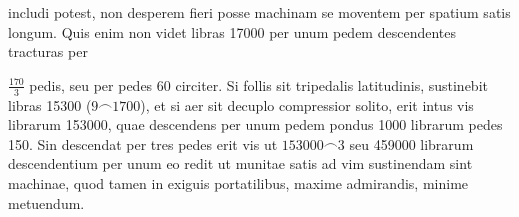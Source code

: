 includi potest,%
non desperem fieri posse machinam%
se moventem per spatium
satis longum.
Quis enim non videt
libras 17000%
per unum pedem%
descendentes
tracturas per
\rule[-3.0mm]{0pt}{8.4mm}%
$\displaystyle\frac{170}{3}$
pedis,%
seu per pedes 60 circiter.
Si follis sit tripedalis latitudinis,
sustinebit libras 15300
($9\smallfrown 1700$),
et si aer sit decuplo compressior solito,%
erit intus vis librarum 153000,
quae descendens per unum pedem
pondus 1000 librarum%
pedes 150.%
Sin descendat per tres pedes
erit vis ut
$153000\smallfrown 3$
seu 459000 librarum descendentium per unum
eo redit
ut munitae satis ad vim sustinendam%
sint machinae,%
quod tamen in exiguis portatilibus,
maxime admirandis,
minime metuendum.
\pend%
%
\frenchspacing%
\normalsize%
